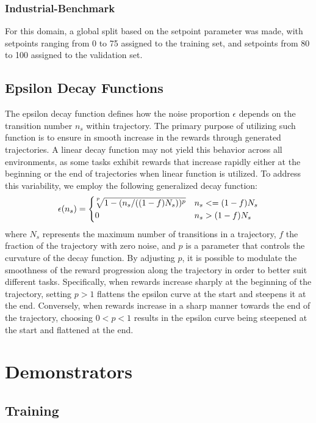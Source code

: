 \documentclass{article}
\theoremstyle{plain}
\theoremstyle{definition}
\theoremstyle{remark}
\begin{document}
\subsubsection{Industrial-Benchmark}\label{appendix:dataset:train-test-split:ib} For this domain, a global split based on the setpoint parameter was made, with setpoints ranging from 0 to 75 assigned to the training set, and setpoints from 80 to 100 assigned to the validation set.
\subsection{Epsilon Decay Functions}\label{appendix:dataset:epsilon-decay}
The epsilon decay function defines how the noise proportion $\epsilon$ depends on the transition number $n_s$ within trajectory. The primary purpose of utilizing such function is to ensure in smooth increase in the rewards through generated trajectories. A linear decay function may not yield this behavior across all environments, as some tasks exhibit rewards that increase rapidly either at the beginning or the end of trajectories when linear function is utilized. To address this variability, we employ the following generalized decay function:
\begin{equation*}
\epsilon(n_s) =
 \begin{cases}
   \sqrt[\leftroot{2} \uproot{5} p]{1-(n_s/((1-f)N_s))^p} &\text{$n_s <= (1-f)N_s$}\\
   0 &\text{$n_s > (1-f)N_s$}
 \end{cases}
\end{equation*}
where $N_s$ represents the maximum number of transitions in a trajectory, $f$ the fraction of the trajectory with zero noise, and $p$ is a parameter that controls the curvature of the decay function. By adjusting $p$, it is possible to modulate the smoothness of the reward progression along the trajectory in order to better suit different tasks. Specifically, when rewards increase sharply at the beginning of the trajectory, setting $p > 1$ flattens the epsilon curve at the start and steepens it at the end. Conversely, when rewards increase in a sharp manner towards the end of the trajectory, choosing $0 < p < 1$ results in the epsilon curve being steepened at the start and flattened at the end.
\section{Demonstrators}\label{appendix:demonstrators}
\subsection{Training}\label{appendix:demonstrators:training}
\end{document}
